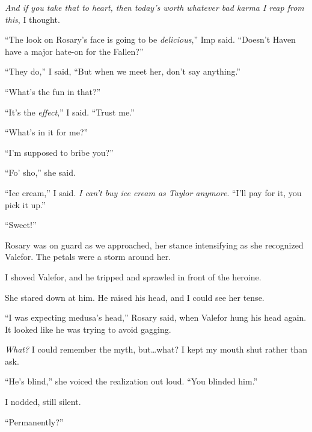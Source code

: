 \emph{And if you take that to heart, then today's worth whatever bad karma I reap from this}, I thought.



``The look on Rosary's face is going to be \emph{delicious},'' Imp said.  ``Doesn't Haven have a major hate-on for the Fallen?''



``They do,'' I said, ``But when we meet her, don't say anything.''



``What's the fun in that?''



``It's the \emph{effect},'' I said.  ``Trust me.''



``What's in it for me?''



``I'm supposed to bribe you?''



``Fo' sho,'' she said.



``Ice cream,'' I said.  \emph{I can't buy ice cream as Taylor anymore}.  ``I'll pay for it, you pick it up.''



``Sweet!''



Rosary was on guard as we approached, her stance intensifying as she recognized Valefor.  The petals were a storm around her.



I shoved Valefor, and he tripped and sprawled in front of the heroine.



She stared down at him.  He raised his head, and I could see her tense.



``I was expecting medusa's head,'' Rosary said, when Valefor hung his head again.  It looked like he was trying to avoid gagging.



\emph{What?}  I could remember the myth, but\ldots what?  I kept my mouth shut rather than ask.



``He's blind,'' she voiced the realization out loud.  ``You blinded him.''



I nodded, still silent.



``Permanently?''



